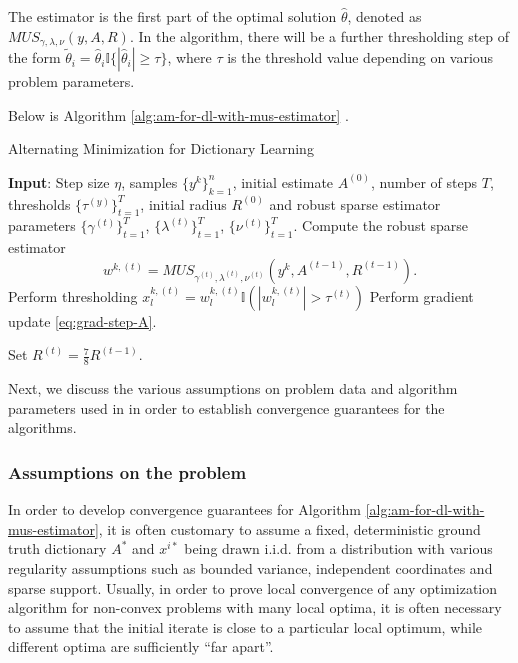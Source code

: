 The estimator is the first part of the optimal solution $\hat{\theta}$, denoted as $MUS_{\gamma,  \lambda, \nu}(y, A, R)$. In the algorithm, there will be a further thresholding step of the form $\tilde{\theta}_i = \hat{\theta}_i \mathbb{I}\{|\hat{\theta}_i| \geq \tau \}$, where $\tau$ is the threshold value depending on various problem parameters.

Below is Algorithm \ref{alg:am-for-dl-with-mus-estimator} \cite{chatterji2017alternating}.

\begin{algorithm}
\caption{Alternating Minimization for Dictionary Learning}
\label{alg:am-for-dl-with-mus-estimator}
\begin{algorithmic}
\STATE \textbf{Input}: Step size $\eta$, samples $\{y^k\}_{k=1}^n$, initial estimate $A^{(0)}$, number of steps $T$, thresholds $\{\tau^{(y)}\}_{t=1}^T$, initial radius $R^{(0)}$ and robust sparse estimator parameters $\{\gamma^{(t)}\}_{t=1}^T$, $\{\lambda^{(t)}\}_{t=1}^T$, $\{\nu^{(t)}\}_{t=1}^T$.
    \STATE Compute the robust sparse estimator \[w^{k, (t)} = MUS_{\gamma^{(t)}, \lambda^{(t)}, \nu^{(t)}}(y^k, A^{(t-1)}, R^{(t-1)}).\] 
        \STATE Perform thresholding $x^{k, (t)}_l = w_l^{k, (t)} \mathbb{I}\left( |w_l^{k, (t)}| > \tau^{(t)} \right)$
    \ENDFOR
\ENDFOR
{}
        \STATE Perform gradient update \eqref{eq:grad-step-A}.
    \ENDFOR
\ENDFOR

\STATE Set $R^{(t)} = \frac{7}{8}R^{(t-1)}$. 
\ENDFOR 
\end{algorithmic}
\end{algorithm}

Next, we discuss the various assumptions on problem data and algorithm parameters used in \cite{chatterji2017alternating} in order to establish convergence guarantees for the algorithms.

\subsubsection{Assumptions on the problem} 

In order to develop convergence guarantees for Algorithm \ref{alg:am-for-dl-with-mus-estimator}, it is often customary to assume a fixed, deterministic ground truth dictionary $A^*$ and $x^{i*}$ being drawn i.i.d. from a distribution with various regularity assumptions such as bounded variance, independent coordinates and sparse support. Usually, in order to prove local convergence of any optimization algorithm for non-convex problems with many local optima, it is often necessary to assume that the initial iterate is close to a particular local optimum, while different optima are sufficiently ``far apart''.

